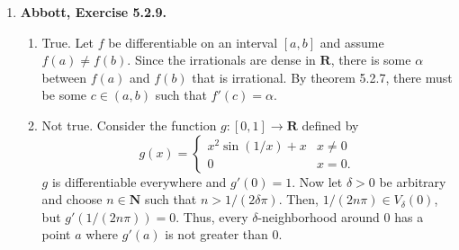 \documentclass{article}
\makeatletter
\DeclarePairedDelimiter\abs{\lvert}{\rvert}
\let\oldabs\abs
\def\abs{\@ifstar{\oldabs}{\oldabs*}}
\newcommand{\N}{\mathbf{N}}
\newcommand{\R}{\mathbf{R}}
\newcommand{\exc}[2][Abbott]{\item \textbf{#1, Exercise #2.}}
\newcommand{\lep}[1][L]{#1et $\epsilon > 0$ be arbitrary}
\let\oldmin\min
\let\oldsin\sin
\renewcommand{\min}[1]{\oldmin \left( #1 \right)}
\renewcommand{\sin}[1]{\oldsin \left( #1 \right)}
\makeatother
\begin{document}
\begin{enumerate}
\begin{enumerate}
        \item Let $f: A \to \R$ be uniformly differentiable on $A$ and choose an arbitrary $c \in A$. \lep. Since $f$ is differentiable at $c$, there is some $\delta_1 > 0$ such that 
        \begin{equation*}
            \abs{\frac{f(c)-f(x)}{c-x} - f'(x)} < \epsilon/2
        \end{equation*} whenever $0 < \abs{x-c} < \delta_1$. Also, since $f$ is uniformly differentiable at $A$, there is some $\delta_1 > 0$ such that
        \begin{equation*}
            \abs{\frac{f(c)-f(x)}{c-x} - f'(c)} < \epsilon/2
        \end{equation*} whenever $0 < \abs{x-c} < \delta_2$. Now set $\delta := \min{\delta_1, \delta_2}$. Then,
        \begin{equation*}
            \abs{f'(x)-f'(c)} \leq \abs{f'(x)-\frac{f(c)-f(x)}{c-x}} + 
            \abs{\frac{f(c)-f(x)}{c-x} - f'(c)} < \epsilon
        \end{equation*} for all $x$ satisfying $0 < \abs{x-c} < \delta$, therefore $f'$ is continuous on $A$.
        
        \item No. Consider the function $g_2$ in the introduction to Chapter 5. $g_2$ is differentiable on $[0, 1]$ but not uniformly differentiable on the same interval.
    \end{enumerate}
    
    \exc{5.2.9}
    \begin{enumerate}
        \item True. Let $f$ be differentiable on an interval $[a, b]$ and assume $f(a) \neq f(b)$. Since the irrationals are dense in $\R$, there is some $\alpha$ between $f(a)$ and $f(b)$ that is irrational. By theorem 5.2.7, there must be some $c \in (a, b)$ such that $f'(c) = \alpha$.
        
        \item Not true. Consider the function $g: [0, 1] \to \R$ defined by
        \begin{equation*}
            g(x) = \begin{cases}
                x^2 \sin{1/x} + x & x \neq 0 \\
                0 & x = 0.
            \end{cases}
        \end{equation*} $g$ is differentiable everywhere and $g'(0) = 1$. Now let $\delta > 0$ be arbitrary and choose $n \in \N$ such that $n > 1/(2 \delta \pi)$. Then, $1/(2n\pi) \in V_{\delta}(0)$, but $g'(1/(2n\pi)) = 0$. Thus, every $\delta$-neighborhood around $0$ has a point $a$ where $g'(a)$ is not greater than $0$. 
        

\end{enumerate}
\end{enumerate}
\end{document}
